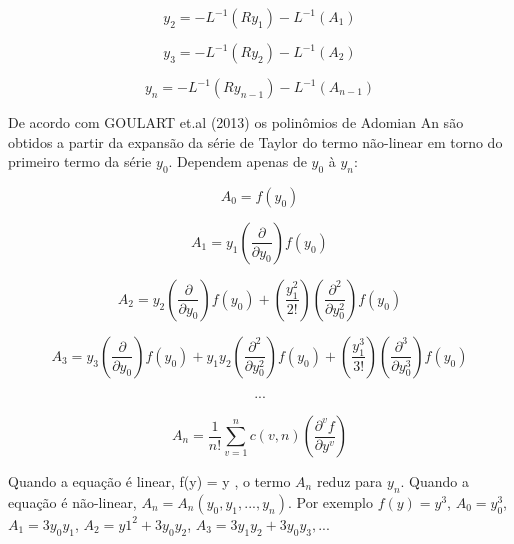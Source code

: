  \begin{equation}y_{2} = -L^{-1} (Ry_{1}) - L^{-1}(A_{1})\end{equation}
 
 \begin{equation}y_{3} = -L^{-1} (Ry_{2}) - L^{-1}(A_{2})
 \end{equation}
 
 \begin{equation}y_{n} = -L^{-1} (Ry_{n-1}) - L^{-1}(A_{n-1})
 \end{equation}
 
  De acordo com GOULART et.al (2013) os polinômios de Adomian An são obtidos a partir da expansão da série de Taylor do termo não-linear em torno do primeiro termo da série $y_{0}$. Dependem apenas de $y_{0}$ à $y_{n}$:
  
  \begin{equation}
  A_{0} = f(y_{0})
  \end{equation}
  
   \begin{equation}
  A_{1} = y_{1}\left(\dfrac{\partial }{\partial y_{0}}\right) f(y_{0})
  \end{equation}
  
  \begin{equation}
  A_{2} = y_{2} \left(\dfrac{\partial }{\partial y_{0}}\right)f(y_{0}) +\left(\dfrac{y_{1}^2}{2!}\right)\left(\dfrac{\partial^2 }{\partial y_{0}^2}\right)f(y_{0})
  \end{equation}
 
   \begin{equation}
  A_{3} = y_{3} \left(\dfrac{\partial }{\partial y_{0}}\right)f(y_{0}) + y_{1}y_{2}\left(\dfrac{\partial^2 }{\partial y_{0}^2}\right)f(y_{0}) + \left(\dfrac{y_{1}^3}{3!}\right)\left(\dfrac{\partial^3 }{\partial y_{0}^3}\right)f(y_{0})
  \end{equation}
  
 \begin{gather*}
 ...
 \end{gather*}
 
 \begin{equation}
  A_{n} = \dfrac{1}{n!} \sum_{v=1}^{n} c(v,n)\left(\dfrac{\partial^vf }{\partial y^v}\right)
 \end{equation}
  
  Quando a equação é linear, f(y) = y , o termo $A_{n}$ reduz para $y_{n}$. Quando a equação é não-linear, $A_{n} = A_{n} (y_{0}, y_{1},...,y_{n})$. Por exemplo $f(y) = y^3$, $A_{0} = y_{0}^3$, $A_{1} = 3y_{0}y_{1}$, $A_{2} = y1^2+3y_{0}y_{2}$, $A_{3} = 3y_{1}y_{2} + 3y_{0}y_{3},...$
  
